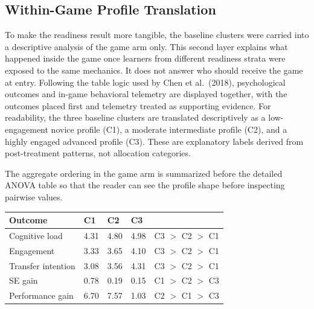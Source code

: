 \documentclass[12pt]{report}
\begin{document}
\subsection*{Within-Game Profile Translation}

To make the readiness result more tangible, the baseline clusters were carried into a descriptive analysis of the game arm only. This second layer explains what happened inside the game once learners from different readiness strata were exposed to the same mechanics. It does not answer who should receive the game at entry. Following the table logic used by Chen et al.\ (2018), psychological outcomes and in-game behavioral telemetry are displayed together, with the outcomes placed first and telemetry treated as supporting evidence. For readability, the three baseline clusters are translated descriptively as a low-engagement novice profile (C1), a moderate intermediate profile (C2), and a highly engaged advanced profile (C3). These are explanatory labels derived from post-treatment patterns, not allocation categories.

The aggregate ordering in the game arm is summarized before the detailed ANOVA table so that the reader can see the profile shape before inspecting pairwise values.

\begin{center}
\small
\setlength{\tabcolsep}{4pt}
\begin{tabularx}{\textwidth}{L{3.2cm}C{1.7cm}C{1.7cm}C{1.7cm}Y}
\toprule
\textbf{Outcome} & \textbf{C1} & \textbf{C2} & \textbf{C3} & \textbf{} \\
\midrule
Cognitive load & 4.31 & 4.80 & 4.98 & C3 $>$ C2 $>$ C1 \\
Engagement & 3.33 & 3.65 & 4.10 & C3 $>$ C2 $>$ C1 \\
Transfer intention & 3.08 & 3.56 & 4.31 & C3 $>$ C2 $>$ C1 \\
SE gain & 0.78 & 0.19 & 0.15 & C1 $>$ C2 $>$ C3 \\
Performance gain & 6.70 & 7.57 & 1.03 & C2 $>$ C1 $>$ C3 \\
\bottomrule
\end{tabularx}
\normalsize
\end{center}
\end{document}
